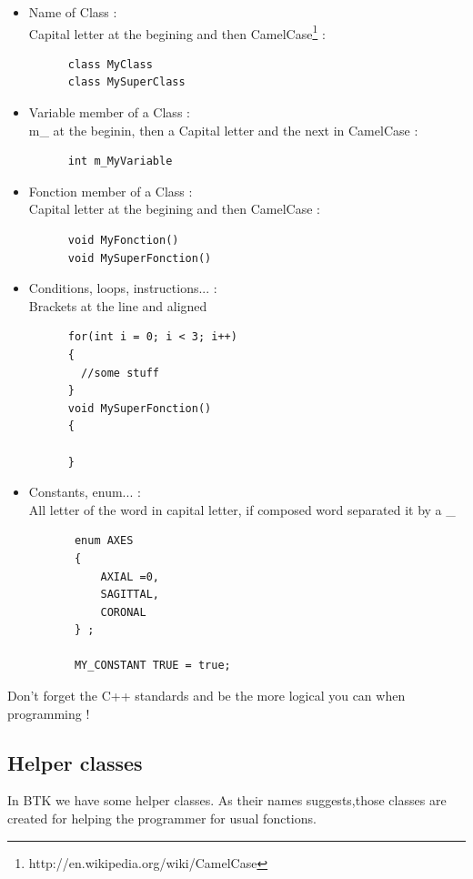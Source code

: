     \begin{itemize}
    \item Name of Class :\\
      Capital letter at the begining and then CamelCase\footnote{ http://en.wikipedia.org/wiki/CamelCase} :
      \begin{verbatim}
      class MyClass
      class MySuperClass
      \end{verbatim}

    \item Variable member of a Class :\\
      m\_ at the beginin, then a Capital letter and the next in CamelCase :
      \begin{verbatim}
      int m_MyVariable
      \end{verbatim}

    \item Fonction member of a Class :\\
      Capital letter at the begining and then CamelCase :
      \begin{verbatim}
      void MyFonction()
      void MySuperFonction()
      \end{verbatim}

    \item Conditions, loops, instructions... :\\
      Brackets at the line and aligned
      \begin{verbatim}
      for(int i = 0; i < 3; i++)
      {
        //some stuff
      }
      void MySuperFonction()
      {
      
      }
      \end{verbatim}

    \item Constants, enum... :\\
      All letter of the word in capital letter, if composed word separated it by a \_
      \begin{verbatim}
       enum AXES
       {
           AXIAL =0,
           SAGITTAL,
           CORONAL
       } ;

       MY_CONSTANT TRUE = true;
      \end{verbatim}

    \end{itemize}

    Don't forget the C++ standards and be the more logical you can when programming !

    \subsection{Helper classes}
    In BTK we have some helper classes. As their names suggests,those classes are created for helping the programmer for usual fonctions.

